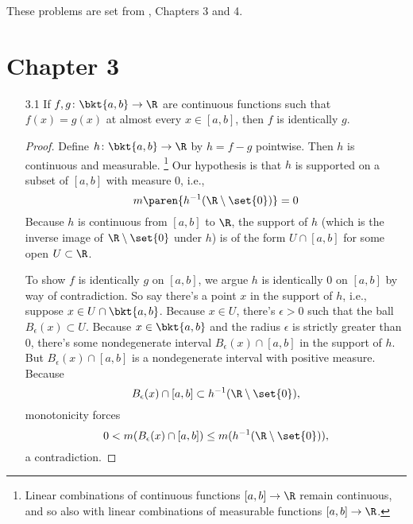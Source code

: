 \documentclass[onesided]{ccg-pset}
\author{Colton Grainger}
\date{\today}
\begin{document}
\maketitle

These problems are set from \cite{RF10}, Chapters 3 and 4.

\section*{Chapter 3}
\begin{enumerate}
\item[3.1] If $f, g \colon \bkt{a,b} \to \R$ are continuous functions such that $f(x) = g(x)$ at almost every $x \in [a,b]$, then $f$ is identically $g$.

\begin{proof}
Define $h \colon \bkt{a,b} \to \R$ by $h = f - g$ pointwise. Then $h$ is continuous and measurable.%
    \footnote{%
    Linear combinations of continuous functions $[a,b] \to \R$ remain continuous, and so also with linear combinations of measurable functions $[a,b] \to \R$.
    }
Our hypothesis is that $h$ is supported on a subset of $[a,b]$ with measure $0$, i.e.,
\begin{equation*}
    m\paren{h^{-1}(\R\setminus\set{0})} = 0
\end{equation*}
Because $h$ is continuous from $[a,b]$ to $\R$, the support of $h$ (which is the inverse image of $\R\setminus\set{0}$ under $h$) is of the form $U \cap [a,b]$ for some open $U \subset \R$. 

To show $f$ is identically $g$ on $[a,b]$, we argue $h$ is identically $0$ on $[a,b]$ by way of contradiction. So say there's a point $x$ in the support of $h$, i.e., suppose $x \in U \cap \bkt{a,b}$. Because $x \in U$, there's $\epsilon > 0$ such that the ball $B_\epsilon(x) \subset U$. Because $x \in \bkt{a,b}$ and the radius $\epsilon$ is strictly greater than $0$, there's some nondegenerate interval $B_\epsilon(x) \cap [a,b]$ in the support of $h$. But $B_\epsilon(x) \cap [a,b]$ is a nondegenerate interval with positive measure. 
Because \[B_\epsilon(x) \cap [a,b] \subset h^{-1}(\R\setminus\set{0}),\] monotonicity forces
\begin{equation*}
    0 < m(B_\epsilon(x) \cap [a,b]) \le m(h^{-1}(\R\setminus\set{0})),
\end{equation*}
a contradiction.
\end{proof}


\end{enumerate}
\end{document}
